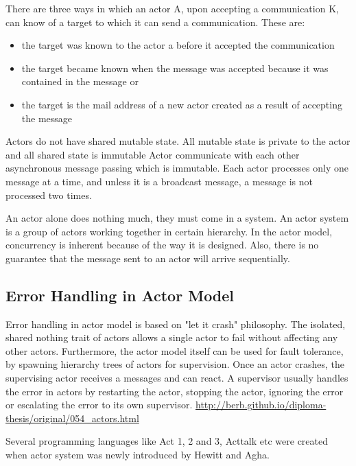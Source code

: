 There are three ways in which an actor A, upon accepting a communication K, can know of a target to which it can send a communication. These are:~\parencite{agha}
\begin{itemize}
  \item the target was known to the actor a before it accepted the communication
  \item the target became known when the message was accepted because it was contained in the message or
  \item the target is the mail address of a new actor created as a result of accepting the message
\end{itemize}

Actors do not have shared mutable state. All mutable state is private to the actor and all shared state is immutable
Actor communicate with each other asynchronous message passing which is immutable.
Each actor processes only one message at a time, and unless it is a broadcast message, a message is not processed two times.

An actor alone does nothing much, they must come in a system. An actor system is a group of actors working together in certain hierarchy.
In the actor model, concurrency is inherent because of the way it is designed. Also, there is no guarantee that the message sent to an actor will arrive sequentially.

\subsection{Error Handling in Actor Model}

Error handling in actor model is based on "let it crash" philosophy. The isolated, shared nothing trait of actors allows a single actor to fail without affecting any other actors. Furthermore, the actor model itself can be used for fault tolerance, by spawning hierarchy trees of actors for supervision. Once an actor crashes, the supervising actor receives a messages and can react. A supervisor usually handles the error in actors by restarting the actor, stopping the actor, ignoring the error or escalating the error to its own supervisor. \url{http://berb.github.io/diploma-thesis/original/054_actors.html}

Several programming languages like Act 1, 2 and 3, Acttalk etc were created when actor system was newly introduced by Hewitt and Agha.

